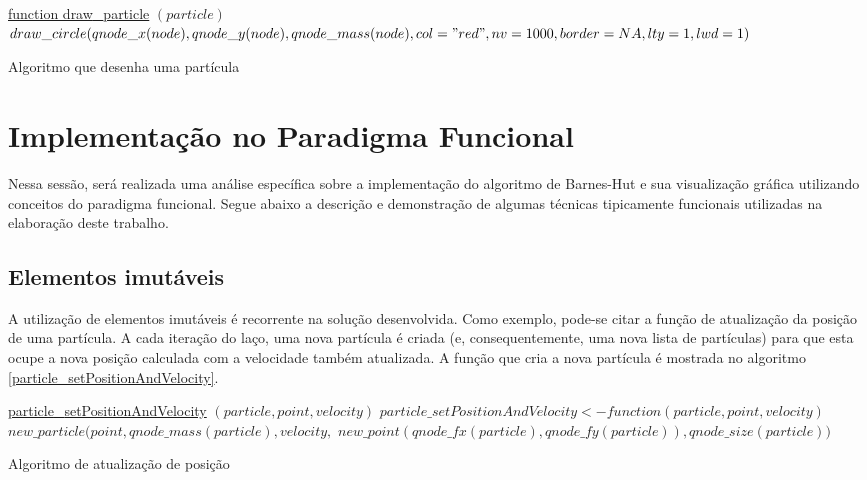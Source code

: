 \documentclass[rel_mlp]{iiufrgs}
\begin{document}
\begin{algorithm}
	\label{draw_particle}
    \underline{function draw{\_}particle} $(particle)$\;
  	$	draw{\_}circle(qnode{\_}x(node), qnode{\_}y(node), qnode{\_}mass (node), col="red", nv=1000, border = NA,lty=1,lwd=1) $\;
    \caption{Algoritmo que desenha uma partícula}
\end{algorithm}

\section{Implementação no Paradigma Funcional}

    Nessa sessão, será realizada uma análise específica sobre a implementação do algoritmo de Barnes-Hut
    e sua visualização gráfica utilizando conceitos do paradigma funcional.
	Segue abaixo a descrição e demonstração de algumas técnicas tipicamente funcionais
    utilizadas na elaboração deste trabalho.

    \subsection{Elementos imutáveis}

    A utilização de elementos imutáveis é recorrente na solução desenvolvida. Como exemplo, pode-se citar a função de atualização da posição de uma partícula. A cada iteração do laço, uma nova partícula é criada (e, consequentemente, uma nova lista de partículas) para que esta ocupe a nova posição calculada com a velocidade também atualizada. A função que cria a nova partícula é mostrada no algoritmo \ref{particle_setPositionAndVelocity}.

    \begin{algorithm}
	\label{particle_setPositionAndVelocity}
    \underline{particle{\_}setPositionAndVelocity} $(particle, point, velocity)$\;
  		$particle{\_}setPositionAndVelocity <- function (particle, point, velocity) $\;
    	$new{\_}particle(point, qnode{\_}mass(particle), velocity, $\;
        $new{\_}point(qnode{\_}fx(particle), qnode{\_}fy(particle)), qnode{\_}size(particle)) $\;
\caption{Algoritmo de atualização de posição}
\end{algorithm}
\end{document}
